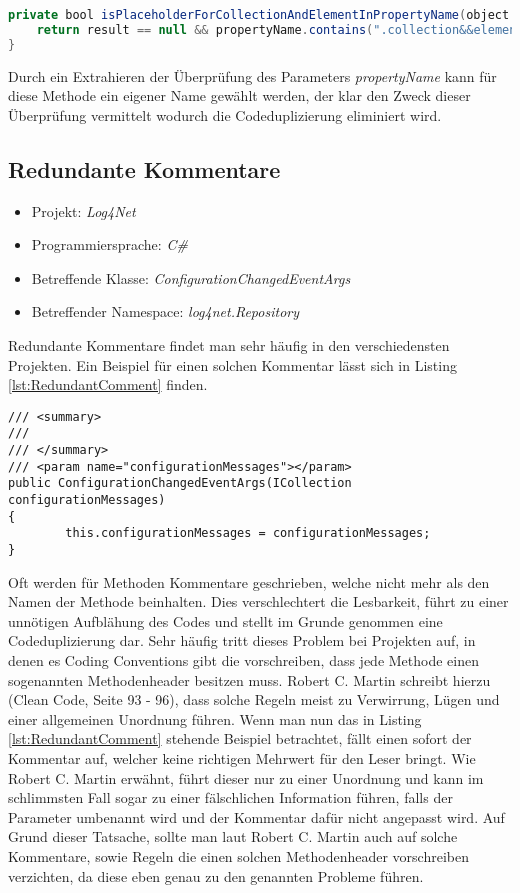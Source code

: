 \begin{lstlisting}[language=Java, caption=Boolscher Ausdruck neu, label=lst:BoolStatement4]
private bool isPlaceholderForCollectionAndElementInPropertyName(object result, String propertyName) {
	return result == null && propertyName.contains(".collection&&element.");
}
\end{lstlisting}

\SuperPar Durch ein Extrahieren der Überprüfung des Parameters \textit{propertyName} kann für diese Methode ein eigener Name gewählt werden, der klar den Zweck dieser Überprüfung vermittelt wodurch die Codeduplizierung eliminiert wird. 

\subsection{Redundante Kommentare}
\begin{itemize}
	\item Projekt: \textit{Log4Net}
	\item Programmiersprache: \textit{C\#}
	\item Betreffende Klasse: \textit{ConfigurationChangedEventArgs}
	\item Betreffender Namespace: \textit{log4net.Repository}
\end{itemize}

\SuperPar Redundante Kommentare findet man sehr häufig in den verschiedensten Projekten. Ein Beispiel für einen solchen Kommentar lässt sich in Listing \ref{lst:RedundantComment}  finden.


\begin{lstlisting}[language={[Sharp]C}, caption=Beispiele für überflüssige Kommentare, label=lst:RedundantComment]
/// <summary>
/// 
/// </summary>
/// <param name="configurationMessages"></param>
public ConfigurationChangedEventArgs(ICollection configurationMessages)
{
		this.configurationMessages = configurationMessages;
}
\end{lstlisting}

\SuperPar Oft werden für Methoden Kommentare geschrieben, welche nicht mehr als den Namen der Methode beinhalten. Dies verschlechtert die Lesbarkeit, führt zu einer unnötigen Aufblähung des Codes und stellt im Grunde genommen eine Codeduplizierung dar. Sehr häufig tritt dieses Problem bei Projekten auf, in denen es Coding Conventions gibt die vorschreiben, dass jede Methode einen sogenannten Methodenheader besitzen muss. Robert C. Martin schreibt hierzu (Clean Code, Seite 93 - 96), dass solche Regeln meist zu Verwirrung, Lügen und einer allgemeinen Unordnung führen.  Wenn man nun das in Listing \ref{lst:RedundantComment} stehende Beispiel betrachtet, fällt einen sofort der Kommentar auf, welcher keine richtigen Mehrwert für den Leser bringt. Wie Robert C. Martin erwähnt, führt dieser nur zu einer Unordnung und kann im schlimmsten Fall sogar zu einer fälschlichen Information führen, falls der Parameter umbenannt wird und der Kommentar dafür nicht angepasst wird. Auf Grund dieser Tatsache, sollte man laut Robert C. Martin auch auf solche Kommentare, sowie Regeln die einen solchen Methodenheader vorschreiben verzichten, da diese eben genau zu den genannten Probleme führen.

